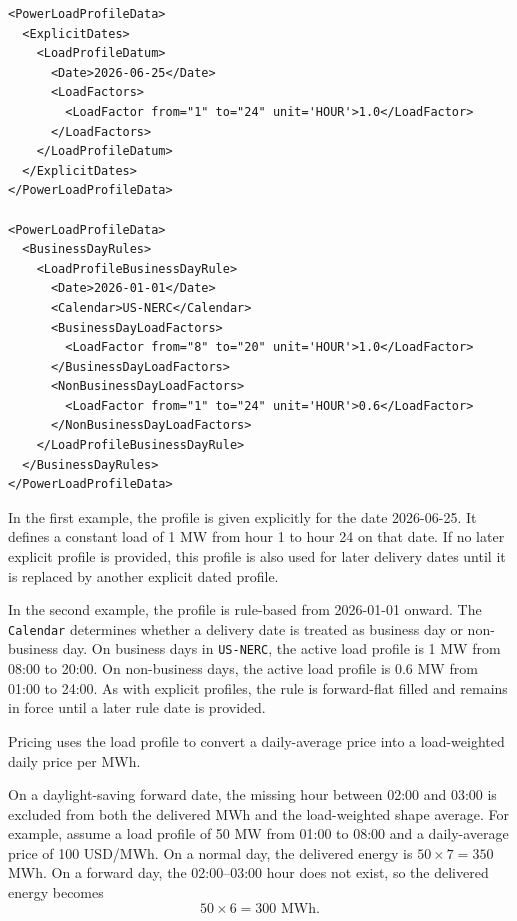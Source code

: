 \begin{listing}[h!]
\begin{verbatim}
<PowerLoadProfileData>
  <ExplicitDates>
    <LoadProfileDatum>
      <Date>2026-06-25</Date>
      <LoadFactors>
        <LoadFactor from="1" to="24" unit='HOUR'>1.0</LoadFactor>
      </LoadFactors>
    </LoadProfileDatum>
  </ExplicitDates>
</PowerLoadProfileData>

<PowerLoadProfileData>
  <BusinessDayRules>
    <LoadProfileBusinessDayRule>
      <Date>2026-01-01</Date>
      <Calendar>US-NERC</Calendar>
      <BusinessDayLoadFactors>
        <LoadFactor from="8" to="20" unit='HOUR'>1.0</LoadFactor>
      </BusinessDayLoadFactors>
      <NonBusinessDayLoadFactors>
        <LoadFactor from="1" to="24" unit='HOUR'>0.6</LoadFactor>
      </NonBusinessDayLoadFactors>
    </LoadProfileBusinessDayRule>
  </BusinessDayRules>
</PowerLoadProfileData>
\end{verbatim}
\caption{Power load profile data examples}
\label{lst:intraday_power_load_profile_data}
\end{listing}

In the first example, the profile is given explicitly for the date 2026-06-25. It defines a constant load of 1 MW
from hour 1 to hour 24 on that date. If no later explicit profile is provided, this profile is also used for later
 delivery dates until it is replaced by another explicit dated profile.

In the second example, the profile is rule-based from 2026-01-01 onward. The \lstinline!Calendar! determines whether a
 delivery date is treated as business day or non-business day. On business days in \lstinline!US-NERC!, the active load
profile is 1 MW from 08:00 to 20:00. On non-business days, the active load profile is 0.6 MW from 01:00 to 24:00.
As with explicit profiles, the rule is forward-flat filled and remains in force until a later rule date is provided.

Pricing uses the load profile to convert a daily-average price into a load-weighted daily price per MWh.

On a daylight-saving forward date, the missing hour between 02:00 and 03:00 is excluded from both the delivered MWh
and the load-weighted shape average. For example, assume a load profile of 50 MW from 01:00 to 08:00 and a
daily-average price of 100 USD/MWh. On a normal day, the delivered energy is $50 \times 7 = 350$ MWh. On a forward
day, the 02:00--03:00 hour does not exist, so the delivered energy becomes
$$
50 \times 6 = 300 \text{ MWh}.
$$